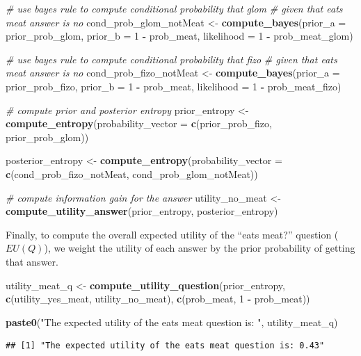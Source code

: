 \documentclass[english,floatsintext,man]{apa6}
\newenvironment{Shaded}{\begin{snugshade}}{\end{snugshade}}
\newcommand{\KeywordTok}[1]{\textcolor[rgb]{0.13,0.29,0.53}{\textbf{#1}}}
\newcommand{\DataTypeTok}[1]{\textcolor[rgb]{0.13,0.29,0.53}{#1}}
\newcommand{\DecValTok}[1]{\textcolor[rgb]{0.00,0.00,0.81}{#1}}
\newcommand{\StringTok}[1]{\textcolor[rgb]{0.31,0.60,0.02}{#1}}
\newcommand{\CommentTok}[1]{\textcolor[rgb]{0.56,0.35,0.01}{\textit{#1}}}
\newcommand{\OperatorTok}[1]{\textcolor[rgb]{0.81,0.36,0.00}{\textbf{#1}}}
\newcommand{\NormalTok}[1]{#1}
\theoremstyle{definition}
\theoremstyle{definition}
\theoremstyle{definition}
\theoremstyle{remark}
\begin{document}
\begin{Shaded}
\begin{Highlighting}[]
\CommentTok{# use bayes rule to compute conditional probability that glom }
\CommentTok{# given that eats meat answer is no}
\NormalTok{cond_prob_glom_notMeat <-}\StringTok{ }\KeywordTok{compute_bayes}\NormalTok{(}\DataTypeTok{prior_a =}\NormalTok{ prior_prob_glom, }
                                        \DataTypeTok{prior_b =} \DecValTok{1} \OperatorTok{-}\StringTok{ }\NormalTok{prob_meat, }
                                        \DataTypeTok{likelihood =} \DecValTok{1} \OperatorTok{-}\StringTok{ }\NormalTok{prob_meat_glom)}

\CommentTok{# use bayes rule to compute conditional probability that fizo }
\CommentTok{# given that eats meat answer is no}
\NormalTok{cond_prob_fizo_notMeat <-}\StringTok{ }\KeywordTok{compute_bayes}\NormalTok{(}\DataTypeTok{prior_a =}\NormalTok{ prior_prob_fizo, }
                                        \DataTypeTok{prior_b =} \DecValTok{1} \OperatorTok{-}\StringTok{ }\NormalTok{prob_meat, }
                                        \DataTypeTok{likelihood =} \DecValTok{1} \OperatorTok{-}\StringTok{ }\NormalTok{prob_meat_fizo)}

\CommentTok{# compute prior and posterior entropy}
\NormalTok{prior_entropy <-}\StringTok{ }\KeywordTok{compute_entropy}\NormalTok{(}\DataTypeTok{probability_vector =} \KeywordTok{c}\NormalTok{(prior_prob_fizo, }
\NormalTok{                                                        prior_prob_glom))}

\NormalTok{posterior_entropy <-}\StringTok{ }\KeywordTok{compute_entropy}\NormalTok{(}\DataTypeTok{probability_vector =} \KeywordTok{c}\NormalTok{(cond_prob_fizo_notMeat, }
\NormalTok{                                                            cond_prob_glom_notMeat))}

\CommentTok{# compute information gain for the answer}
\NormalTok{utility_no_meat <-}\StringTok{ }\KeywordTok{compute_utility_answer}\NormalTok{(prior_entropy, posterior_entropy)}
\end{Highlighting}
\end{Shaded}

\noindent
Finally, to compute the overall expected utility of the \enquote{eats
meat?} question (\(EU(Q)\)), we weight the utility of each answer by the
prior probability of getting that answer.

\begin{Shaded}
\begin{Highlighting}[]
\NormalTok{utility_meat_q <-}\StringTok{ }\KeywordTok{compute_utility_question}\NormalTok{(prior_entropy,}
                                           \KeywordTok{c}\NormalTok{(utility_yes_meat, utility_no_meat),}
                                           \KeywordTok{c}\NormalTok{(prob_meat, }\DecValTok{1} \OperatorTok{-}\StringTok{ }\NormalTok{prob_meat))}

\KeywordTok{paste0}\NormalTok{(}\StringTok{"The expected utility of the eats meat question is: "}\NormalTok{, utility_meat_q)}
\end{Highlighting}
\end{Shaded}

\begin{verbatim}
## [1] "The expected utility of the eats meat question is: 0.43"
\end{verbatim}
\end{document}

